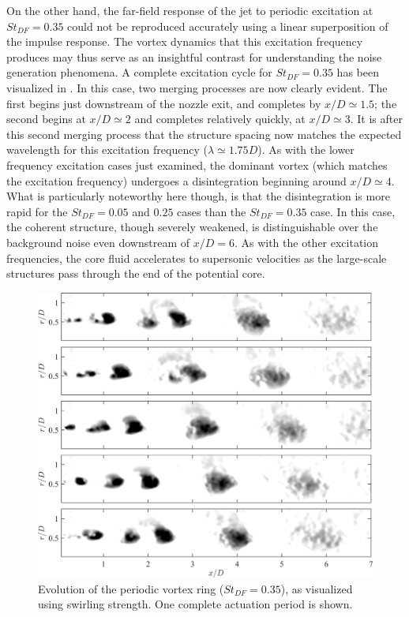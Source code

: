 On the other hand, the far-field response of the jet to periodic excitation at $St_{DF}=0.35$ could not be reproduced accurately using a linear superposition of the impulse response.
The vortex dynamics that this excitation frequency produces may thus serve as an insightful contrast for understanding the noise generation phenomena.
A complete excitation cycle for $St_{DF}=0.35$ has been visualized in .
In this case, two merging processes are now clearly evident.
The first begins just downstream of the nozzle exit, and completes by $x/D \simeq 1.5$; the second begins at $x/D \simeq 2$ and completes relatively quickly, at $x/D \simeq 3$.
It is after this second merging process that the structure spacing now matches the expected wavelength for this excitation frequency ($\lambda \simeq 1.75D$).
As with the lower frequency excitation cases just examined, the dominant vortex (which matches the excitation frequency) undergoes a disintegration beginning around $x/D \simeq 4$.
What is particularly noteworthy here though, is that the disintegration is more rapid for the $St_{DF}=0.05$ and $0.25$ cases than the $St_{DF}=0.35$ case.
In this case, the coherent structure, though severely weakened, is distinguishable over the background noise even downstream of $x/D = 6$.
As with the other excitation frequencies, the core fluid accelerates to supersonic velocities as the large-scale structures pass through the end of the potential core.
\begin{figure}
	\centering
	\includegraphics[width=5in]{Figures/ch4_St035_lambda_evolution.png}
	\caption{Evolution of the periodic vortex ring ($St_{DF}=0.35$), as visualized using swirling strength. One complete actuation period is shown.}
	\label{fig:ch4_St035_structure_disintegration}
\end{figure}

